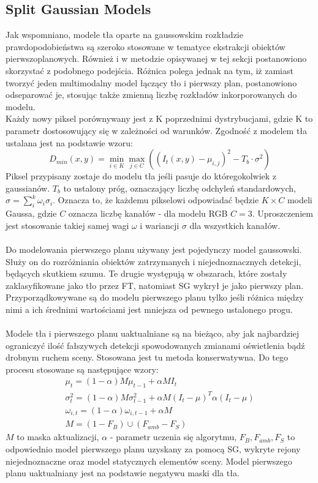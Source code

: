 \subsection{Split Gaussian Models}
\label{sec:SG}
Jak wspomniano, modele tła oparte na gaussowskim rozkładzie prawdopodobieństwa są szeroko stosowane w tematyce ekstrakcji obiektów pierwszoplanowych. Również i w metodzie opisywanej w tej sekcji postanowiono skorzystać z podobnego podejścia. Różnica polega jednak na tym, iż zamiast tworzyć jeden multimodalny model łączący tło i pierwszy plan, postanowiono odseparować je, stosując także zmienną liczbę rozkładów inkorporowanych do modelu.\\
Każdy nowy piksel porównywany jest z K poprzednimi dystrybucjami, gdzie K to parametr dostosowujący się w zależności od warunków. Zgodność z modelem tła ustalana jest na podstawie wzoru:
\begin{equation}
D_{min}(x,y) = \min_{i\in K}\max_{j\in C}((I_{t}(x,y)-\mu_{i,j})^2-T_{b}\cdot\sigma^2)
\end{equation}
Piksel przypisany zostaje do modelu tła jeśli pasuje do któregokolwiek z gaussianów. $T_{b}$ to ustalony próg, oznaczający liczbę odchyleń standardowych, $\sigma = \sum_{i}^{k}\omega_{i}\sigma_{i}$. Oznacza to, że każdemu pikselowi odpowiadać będzie $K\times C$ modeli Gaussa, gdzie $C$ oznacza liczbę kanałów - dla modelu RGB $C = 3$. Uproszczeniem jest stosowanie takiej samej wagi $\omega$ i wariancji $\sigma$ dla wszystkich kanałów.
\paragraph{}
Do modelowania pierwszego planu używany jest pojedynczy model gaussowski. Służy on do rozróżniania obiektów zatrzymanych i niejednoznacznych detekcji, będących skutkiem szumu. Te drugie występują w obszarach, które zostały zaklasyfikowane jako tło przez FT, natomiast SG wykrył je jako pierwszy plan. Przyporządkowywane są do modelu pierwszego planu tylko jeśli różnica między nimi a ich średnimi wartościami jest mniejsza od pewnego ustalonego progu.
\paragraph{}
Modele tła i pierwszego planu uaktualniane są na bieżąco, aby jak najbardziej ograniczyć ilość fałszywych detekcji spowodowanych zmianami oświetlenia bądź drobnym ruchem sceny. Stosowana jest tu metoda konserwatywna. Do tego procesu stosowane są następujące wzory:
\begin{gather}
\mu_{t} = (1-\alpha)M\mu_{t-1}+\alpha MI_{t} \\
\sigma_{t}^2 = (1-\alpha)M\sigma_{t-1}^2+\alpha M(I_{t}-\mu)^{T}\alpha(I_{t}-\mu) \\
\omega_{i,t} = (1-\alpha)\omega_{i,t-1}+\alpha M \\
M = (1-F_{B})\cup(F_{amb}-F_{S})
\end{gather}
$M$ to maska aktualizacji, $\alpha$ - parametr uczenia się algorytmu, $F_{B}, F_{amb}, F_{S}$ to odpowiednio model pierwszego planu uzyskany za pomocą SG, wykryte rejony niejednoznaczne oraz model statycznych elementów sceny. Model pierwszego planu uaktualniany jest na podstawie negatywu maski dla tła.
